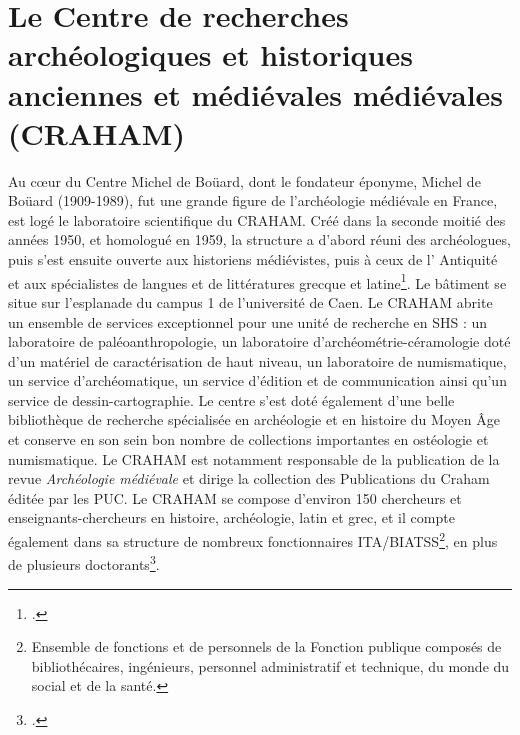 \documentclass[a4paper,12pt,twoside]{book}
\begin{document}
    
    \section{Le Centre de recherches archéologiques et historiques anciennes et médiévales médiévales (CRAHAM)}
    
    Au c\oe{}ur du Centre Michel de Boüard, dont le fondateur éponyme, Michel de Boüard (1909-1989), fut une grande figure de l'archéologie médiévale en France, est logé le laboratoire scientifique du CRAHAM. Créé dans la seconde moitié des années 1950, et homologué en 1959, la structure a d'abord réuni des archéologues, puis s'est ensuite ouverte aux historiens médiévistes, puis à ceux de l' Antiquité et aux spécialistes de langues et de littératures grecque et latine\footcite{craham}. Le bâtiment se situe sur l'esplanade du campus 1 de l'université de Caen. Le \acrshort{CRAHAM} abrite un ensemble de services exceptionnel pour une unité de recherche en \acrshort{SHS} : un laboratoire de paléoanthropologie, un laboratoire d'archéométrie-céramologie doté d'un matériel de caractérisation de haut niveau, un laboratoire de numismatique, un service d'archéomatique, un service d'édition et de communication ainsi qu'un service de dessin-cartographie. Le centre s'est doté également d'une belle bibliothèque de recherche spécialisée en archéologie et en histoire du Moyen Âge et conserve en son sein bon nombre de collections importantes en ostéologie et numismatique. Le \acrshort{CRAHAM} est notamment responsable de la publication de la revue \textit{Archéologie médiévale} et dirige la collection des \og Publications du Craham\fg{} éditée par les \acrlong{PUC}. Le \acrshort{CRAHAM} se compose d'environ 150 chercheurs et enseignants-chercheurs en histoire, archéologie, latin et grec, et il compte également dans sa structure de nombreux fonctionnaires ITA/BIATSS\footnote{Ensemble de fonctions et de personnels de la Fonction publique composés de bibliothécaires, ingénieurs, personnel administratif et technique, du monde du social et de la santé.}, en plus de plusieurs doctorants\footcite{craham}.
\end{document}
